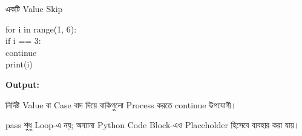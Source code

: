 \begin{codeoutputbox}{একটি Value Skip}

\noindent
\begin{minipage}[t]{0.53\linewidth}
\codeheading

\begin{english}
\ttfamily
for i in range(1, 6):\\
\hspace*{4mm}if i == 3:\\
\hspace*{8mm}continue\\
\hspace*{4mm}print(i)
\end{english}

\end{minipage}
\hfill
\begin{minipage}[t]{0.43\linewidth}
\outputheading

\textbf{Output:}

\begin{center}
\textenglish{   }
\end{center}

নির্দিষ্ট Value বা Case বাদ দিয়ে বাকিগুলো Process করতে
\textenglish{\ttfamily continue}
উপযোগী।

\end{minipage}

\end{codeoutputbox}



\textenglish{\ttfamily pass}
শুধু Loop-এ নয়; অন্যান্য Python Code Block-এও Placeholder হিসেবে
ব্যবহার করা যায়।

